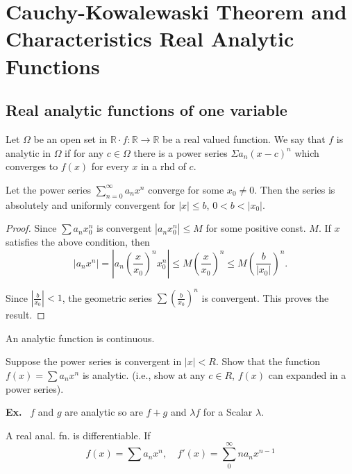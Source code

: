 \chapter{Cauchy-Kowalewaski Theorem and Characteristics Real Analytic Functions}\label{chap1}


\section*{Real analytic functions of one variable}\pageoriginale

Let $\Omega$ be an open set in $\mathbb{R}\cdot f : \mathbb{R}\to \mathbb{R}$ be a real valued function. We say that $f$ is analytic in $\Omega$ if for any $c\in \Omega$ there is a power series $\Sigma a_{n}(x-c)^{n}$ which converges to $f(x)$ for every $x$ in a rhd of $c$.

\begin{prop*}
Let the power series $\sum\limits^{\infty}_{n=0}a_{n}x^{n}$ converge for some $x_{0}\neq 0$. Then the series is absolutely and uniformly convergent for $|x|\leq b$, $0<b<|x_{0}|$.
\end{prop*}

\begin{proof}
Since $\sum a_{n}x^{n}_{0}$ is convergent $|a_{n}x^{n}_{0}|\leq M$ for some positive const. $M$. If $x$ satisfies the above condition, then
$$
|a_{n}x^{n}|=\left|a_{n}\left(\frac{x}{x_{0}}\right)^{n}x^{n}_{0}\right|\leq M \left(\frac{x}{x_{0}}\right)^{n}\leq M\left(\frac{b}{|x_{0}|}\right)^{n}.
$$

Since $\left|\frac{b}{x_{0}}\right|<1$, the geometric series $\sum \left(\frac{b}{x_{0}}\right)^{n}$ is convergent. This proves the result.
\end{proof}

\begin{coro*}
An analytic function is continuous.
\end{coro*}

\begin{exer*}
Suppose the power series is convergent in $|x|<R$. Show that the function $f(x)=\sum a_{n}x^{n}$ is analytic. (i.e., show at any $c\in R$, $f(x)$ can expanded in a power series).
\end{exer*}

\noindent
{\bf Ex.}~ $f$ and $g$ are analytic so are $f+g$ and $\lambda f$ for a Scalar $\lambda$.

\begin{prop*}
A real anal. fn. is differentiable. If
$$
f(x)=\sum a_{n}x^{n},\quad f'(x)=\sum\limits^{\infty}_{0}na_{n}x^{n-1}
$$
\end{prop*}

